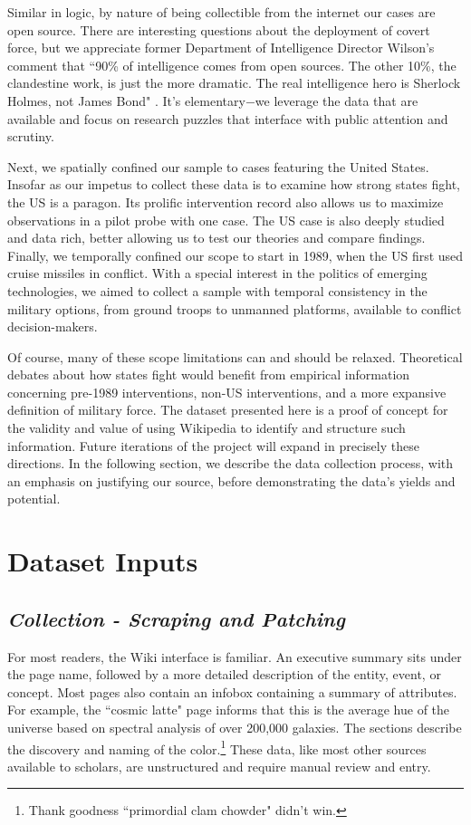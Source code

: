 \documentclass[fleqn,12pt]{article}
\begin{document}
Similar in logic, by nature of being collectible from the internet our cases are open source. There are interesting questions about the deployment of covert force, but we appreciate former Department of Intelligence Director Wilson's comment that ``90\% of intelligence comes from open sources. The other 10\%, the clandestine work, is just the more dramatic. The real intelligence hero is Sherlock Holmes, not James Bond" \citep{Lands19}. It's elementary$-$we leverage the data that are available and focus on research puzzles that interface with public attention and scrutiny.

Next, we spatially confined our sample to cases featuring the United States. Insofar as our impetus to collect these data is to examine how strong states fight, the US is a paragon. Its prolific intervention record also allows us to maximize observations in a pilot probe with one case. The US case is also deeply studied and data rich, better allowing us to test our theories and compare findings. Finally, we temporally confined our scope to start in 1989, when the US first used cruise missiles in conflict. With a special interest in the politics of emerging technologies, we aimed to collect a sample with temporal consistency in the military options, from ground troops to unmanned platforms, available to conflict decision-makers.

Of course, many of these scope limitations can and should be relaxed. Theoretical debates about how states fight would benefit from empirical information concerning pre-1989 interventions, non-US interventions, and a more expansive definition of military force. The dataset presented here is a proof of concept for the validity and value of using Wikipedia to identify and structure such information. Future iterations of the project will expand in precisely these directions. In the following section, we describe the data collection process, with an emphasis on justifying our source, before demonstrating the data's yields and potential.

\section*{Dataset Inputs}
\subsection*{\textit{Collection - Scraping and Patching}}
For most readers, the Wiki interface is familiar. An executive summary sits under the page name, followed by a more detailed description of the entity, event, or concept. Most pages also contain an infobox containing a summary of attributes. For example, the ``cosmic latte" page informs that this is the average hue of the universe based on spectral analysis of over 200,000 galaxies. The sections describe the discovery and naming of the color.\footnote{Thank goodness ``primordial clam chowder" didn't win.} These data, like most other sources available to scholars, are unstructured and require manual review and entry.
\end{document}
